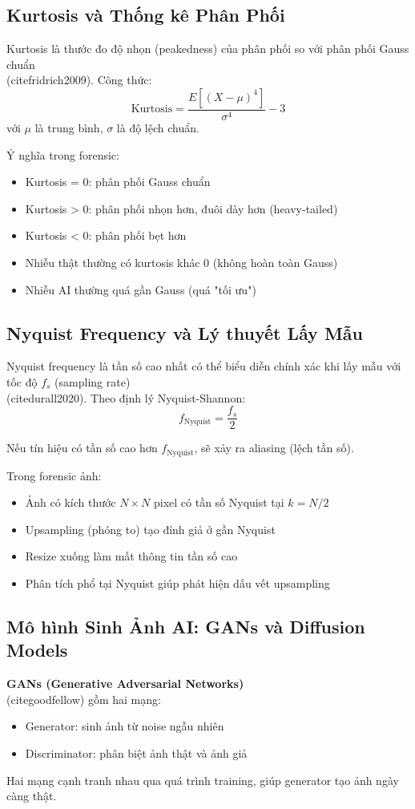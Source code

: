 \documentclass[14pt,a4paper,oneside]{report}
\begin{document}
\subsection{Kurtosis và Thống kê Phân Phối}
Kurtosis là thước đo độ nhọn (peakedness) của phân phối so với phân phối Gauss chuẩn \\(cite{fridrich2009}). Công thức:
\[
\text{Kurtosis}=\frac{E[(X-\mu)^4]}{\sigma^4}-3
\]
với $\mu$ là trung bình, $\sigma$ là độ lệch chuẩn.

Ý nghĩa trong forensic:
\begin{itemize}
  \item Kurtosis = 0: phân phối Gauss chuẩn
  \item Kurtosis > 0: phân phối nhọn hơn, đuôi dày hơn (heavy-tailed)
  \item Kurtosis < 0: phân phối bẹt hơn
  \item Nhiễu thật thường có kurtosis khác 0 (không hoàn toàn Gauss)
  \item Nhiễu AI thường quá gần Gauss (quá "tối ưu")
\end{itemize}

\subsection{Nyquist Frequency và Lý thuyết Lấy Mẫu}
Nyquist frequency là tần số cao nhất có thể biểu diễn chính xác khi lấy mẫu với tốc độ $f_s$ (sampling rate) \\(cite{durall2020}). Theo định lý Nyquist-Shannon:
\[
f_{\text{Nyquist}}=\frac{f_s}{2}
\]

Nếu tín hiệu có tần số cao hơn $f_{\text{Nyquist}}$, sẽ xảy ra aliasing (lệch tần số).

Trong forensic ảnh:
\begin{itemize}
  \item Ảnh có kích thước $N\times N$ pixel có tần số Nyquist tại $k=N/2$
  \item Upsampling (phóng to) tạo đỉnh giả ở gần Nyquist
  \item Resize xuống làm mất thông tin tần số cao
  \item Phân tích phổ tại Nyquist giúp phát hiện dấu vết upsampling
\end{itemize}

\subsection{Mô hình Sinh Ảnh AI: GANs và Diffusion Models}
\textbf{GANs (Generative Adversarial Networks)} \\(cite{goodfellow}) gồm hai mạng:
\begin{itemize}
  \item Generator: sinh ảnh từ noise ngẫu nhiên
  \item Discriminator: phân biệt ảnh thật và ảnh giả
\end{itemize}
Hai mạng cạnh tranh nhau qua quá trình training, giúp generator tạo ảnh ngày càng thật.
\end{document}
